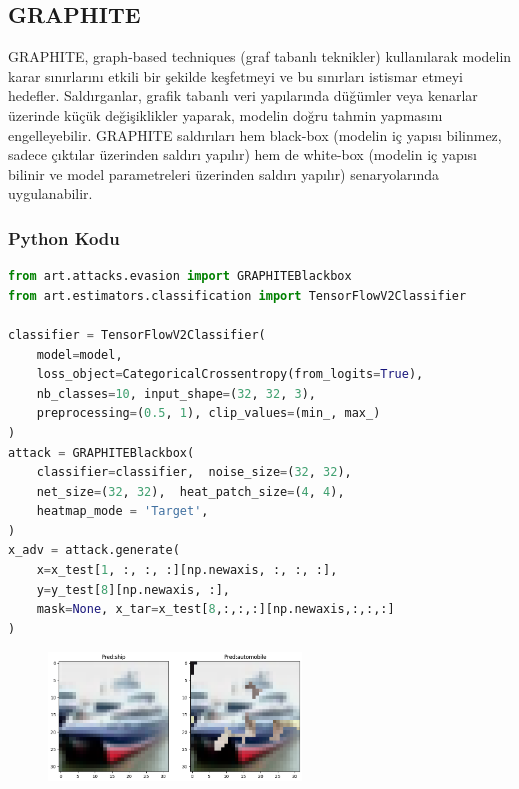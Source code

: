 \newpage

\subsection{GRAPHITE}

GRAPHITE, graph-based techniques (graf tabanlı teknikler) kullanılarak modelin karar sınırlarını etkili bir şekilde keşfetmeyi ve bu sınırları istismar etmeyi hedefler. Saldırganlar, grafik tabanlı veri yapılarında düğümler veya kenarlar üzerinde küçük değişiklikler yaparak, modelin doğru tahmin yapmasını engelleyebilir. GRAPHITE saldırıları hem black-box (modelin iç yapısı bilinmez, sadece çıktılar üzerinden saldırı yapılır) hem de white-box (modelin iç yapısı bilinir ve model parametreleri üzerinden saldırı yapılır) senaryolarında uygulanabilir.

\subsubsection{Python Kodu}

\begin{lstlisting}[language=Python]
from art.attacks.evasion import GRAPHITEBlackbox
from art.estimators.classification import TensorFlowV2Classifier

classifier = TensorFlowV2Classifier(
    model=model,
    loss_object=CategoricalCrossentropy(from_logits=True),
    nb_classes=10, input_shape=(32, 32, 3),
    preprocessing=(0.5, 1), clip_values=(min_, max_)
)
attack = GRAPHITEBlackbox(
    classifier=classifier,  noise_size=(32, 32), 
    net_size=(32, 32),  heat_patch_size=(4, 4),
    heatmap_mode = 'Target',
)
x_adv = attack.generate(
    x=x_test[1, :, :, :][np.newaxis, :, :, :], 
    y=y_test[8][np.newaxis, :], 
    mask=None, x_tar=x_test[8,:,:,:][np.newaxis,:,:,:]
)
\end{lstlisting}

\begin{figure}[h]
    \centering
    \includegraphics[width=0.6\textwidth]{images/graphite_results.png}
    \caption{}
\end{figure}


